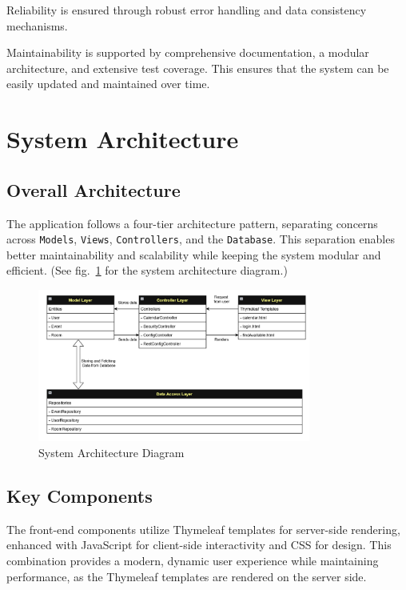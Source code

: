Reliability is ensured through robust error handling and data consistency mechanisms.

Maintainability is supported by comprehensive documentation, a modular architecture, and extensive test coverage.
This ensures that the system can be easily updated and maintained over time.


\section{System Architecture}\label{sec:system-architecture}

\subsection{Overall Architecture}\label{subsec:overall-architecture}
The application follows a four-tier architecture pattern, separating concerns across \texttt{Models}, \texttt{Views}, \texttt{Controllers}, and the \texttt{Database}. This separation enables better maintainability and scalability while keeping the system modular and efficient.
(See fig.~\ref{fig:architecture} for the system architecture diagram.)

\begin{figure}[h]
    \centering
    \includegraphics[width=0.8\textwidth]{MVCSchema}
    \caption{System Architecture Diagram}
    \label{fig:architecture}
\end{figure}

\subsection{Key Components}\label{subsec:key-components}

The front-end components utilize Thymeleaf templates for server-side rendering, enhanced with JavaScript for client-side interactivity and CSS for design.
This combination provides a modern, dynamic user experience while maintaining performance, as the Thymeleaf templates are rendered on the server side.

